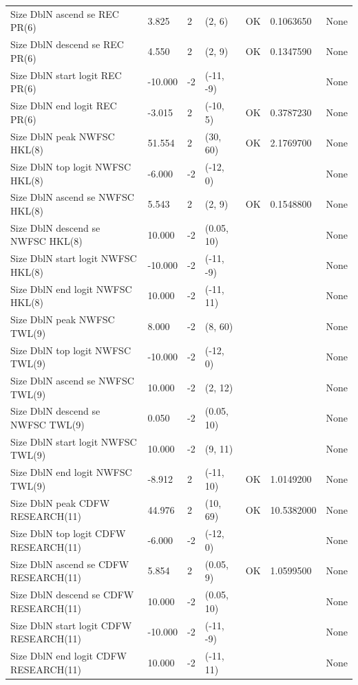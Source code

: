 \documentclass[11pt,
  english,
]{article}
\begin{document}
\begin{landscape}
\begin{longtable}[t]{lllllll}
Size DblN ascend se REC PR(6) & 3.825 & 2 & (2, 6) & OK & 0.1063650 & None\\
\addlinespace
Size DblN descend se REC PR(6) & 4.550 & 2 & (2, 9) & OK & 0.1347590 & None\\
Size DblN start logit REC PR(6) & -10.000 & -2 & (-11, -9) &  &  & None\\
Size DblN end logit REC PR(6) & -3.015 & 2 & (-10, 5) & OK & 0.3787230 & None\\
Size DblN peak NWFSC HKL(8) & 51.554 & 2 & (30, 60) & OK & 2.1769700 & None\\
Size DblN top logit NWFSC HKL(8) & -6.000 & -2 & (-12, 0) &  &  & None\\
\addlinespace
Size DblN ascend se NWFSC HKL(8) & 5.543 & 2 & (2, 9) & OK & 0.1548800 & None\\
Size DblN descend se NWFSC HKL(8) & 10.000 & -2 & (0.05, 10) &  &  & None\\
Size DblN start logit NWFSC HKL(8) & -10.000 & -2 & (-11, -9) &  &  & None\\
Size DblN end logit NWFSC HKL(8) & 10.000 & -2 & (-11, 11) &  &  & None\\
Size DblN peak NWFSC TWL(9) & 8.000 & -2 & (8, 60) &  &  & None\\
\addlinespace
Size DblN top logit NWFSC TWL(9) & -10.000 & -2 & (-12, 0) &  &  & None\\
Size DblN ascend se NWFSC TWL(9) & 10.000 & -2 & (2, 12) &  &  & None\\
Size DblN descend se NWFSC TWL(9) & 0.050 & -2 & (0.05, 10) &  &  & None\\
Size DblN start logit NWFSC TWL(9) & 10.000 & -2 & (9, 11) &  &  & None\\
Size DblN end logit NWFSC TWL(9) & -8.912 & 2 & (-11, 10) & OK & 1.0149200 & None\\
\addlinespace
Size DblN peak CDFW RESEARCH(11) & 44.976 & 2 & (10, 69) & OK & 10.5382000 & None\\
Size DblN top logit CDFW RESEARCH(11) & -6.000 & -2 & (-12, 0) &  &  & None\\
Size DblN ascend se CDFW RESEARCH(11) & 5.854 & 2 & (0.05, 9) & OK & 1.0599500 & None\\
Size DblN descend se CDFW RESEARCH(11) & 10.000 & -2 & (0.05, 10) &  &  & None\\
Size DblN start logit CDFW RESEARCH(11) & -10.000 & -2 & (-11, -9) &  &  & None\\
\addlinespace
Size DblN end logit CDFW RESEARCH(11) & 10.000 & -2 & (-11, 11) &  &  & None\\

\end{longtable}
\end{landscape}
\end{document}
